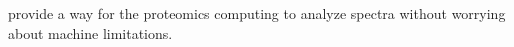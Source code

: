 provide a way for the proteomics computing to analyze spectra without worrying about machine limitations.
